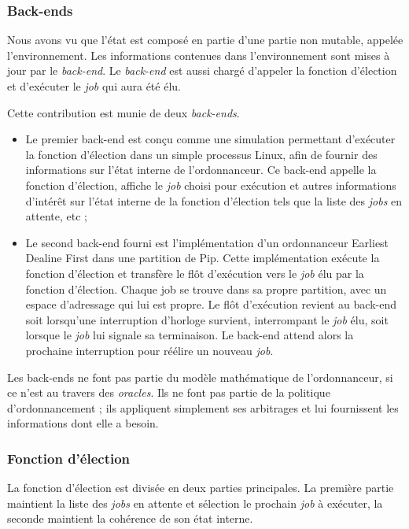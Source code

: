 		\subsubsection{Back-ends}
		\label{sec:back-ends}

		Nous avons vu que l'état est composé en partie d'une partie non mutable, appelée l'environnement. Les informations contenues dans l'environnement sont mises à jour par le \emph{back-end}. Le \emph{back-end} est aussi chargé d'appeler la fonction d'élection et d'exécuter le \emph{job} qui aura été élu.

		Cette contribution est munie de deux \emph{back-ends}.
		\begin{itemize}
			\item Le premier back-end est conçu comme une simulation permettant d'exécuter la fonction d'élection dans un simple processus Linux, afin de fournir des informations sur l'état interne de l'ordonnanceur. Ce back-end appelle la fonction d'élection, affiche le \emph{job} choisi pour exécution et autres informations d'intérêt sur l'état interne de la fonction d'élection tels que la liste des \emph{jobs} en attente, etc ;

			\item Le second back-end fourni est l'implémentation d'un ordonnanceur Earliest Dealine First dans une partition de Pip. Cette implémentation exécute la fonction d'élection et transfère le flôt d'exécution vers le \emph{job} élu par la fonction d'élection. Chaque job se trouve dans sa propre partition, avec un espace d'adressage qui lui est propre. Le flôt d'exécution revient au back-end soit lorsqu'une interruption d'horloge survient, interrompant le \emph{job} élu, soit lorsque le \emph{job} lui signale sa terminaison. Le back-end attend alors la prochaine interruption pour réélire un nouveau \emph{job}.
		\end{itemize}

		Les back-ends ne font pas partie du modèle mathématique de l'ordonnanceur, si ce n'est au travers des \emph{oracles}. Ils ne font pas partie de la politique d'ordonnancement ; ils appliquent simplement ses arbitrages et lui fournissent les informations dont elle a besoin.

		\subsubsection{Fonction d'élection}

		La fonction d'élection est divisée en deux parties principales. La première partie maintient la liste des \emph{jobs} en attente et sélection le prochain \emph{job} à exécuter, la seconde maintient la cohérence de son état interne.

